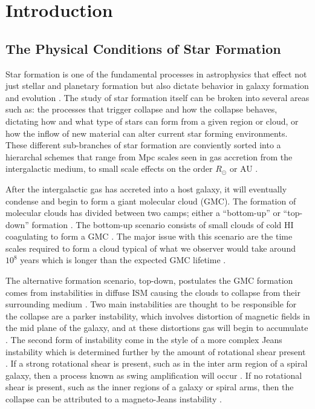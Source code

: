 \chapter{Introduction}\label{intro}

\section{The Physical Conditions of Star Formation}

Star formation is one of the fundamental processes in astrophysics that effect not just stellar and planetary formation but also dictate behavior in galaxy formation and evolution \citep{kennicutt2012}.  The study of star formation itself can be broken into several areas such as: the processes that trigger collapse and how the collapse behaves, dictating how and what type of stars can form from a given region or cloud, or how the inflow of new material can alter current star forming environments.  These different sub-branches of star formation are conviently sorted into a hierarchal schemes that range from Mpc scales seen in gas accretion from the intergalactic medium, to small scale effects on the order $R_\odot$ or AU \citep{kennicutt2012}.

After the intergalactic gas has accreted into a host galaxy, it will eventually condense and begin to form a giant molecular cloud (GMC).  The formation of molecular clouds has divided between two camps; either a ``bottom-up'' or ``top-down'' formation \citep{mckee2007}.  The bottom-up scenario consists of small clouds of cold HI coagulating to form a GMC \citep{field1965, kwan1979}.  The major issue with this scenario are the time scales required to form a cloud typical of what we observer would take around $10^8$ years which is longer than the expected GMC lifetime \citep{mckee2007}.  

The alternative formation scenario, top-down, postulates the GMC formation comes from instabilities in diffuse ISM causing the clouds to collapse from their surrounding medium \citep{mckee2007}.  Two main instabilities are thought to be responsible for the collapse are a parker instability, which involves distortion of magnetic fields in the mid plane of the galaxy, and at these distortions gas will begin to accumulate \citep{parker1966, dobbs2013}.  The second form of instability come in the style of a more complex Jeans instability which is determined further by the amount of rotational shear present \citep{mckee2007}.  If a strong rotational shear is present, such as in the inter arm region of a spiral galaxy, then a process known as swing amplification will occur \citep{mckee2007}.  If no rotational shear is present, such as the inner regions of a galaxy or spiral arms, then the collapse can be attributed to a magneto-Jeans instability \citep{elmegreen1987,kim2001}.


